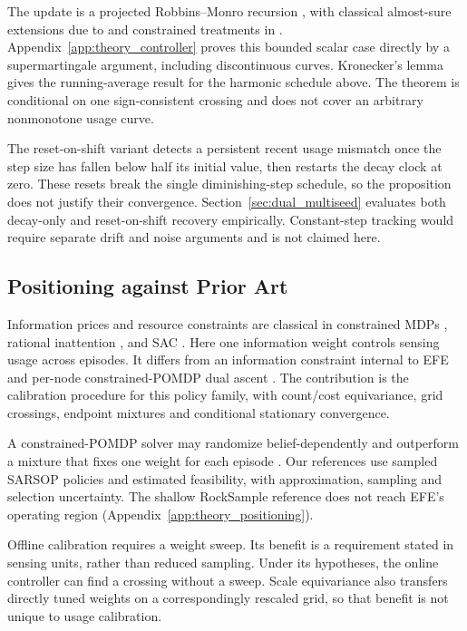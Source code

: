 \documentclass[runningheads]{llncs}
\begin{document}
The update is a projected Robbins--Monro recursion \citep{robbins1951}, with classical almost-sure extensions due to \citet{blum1954} and constrained treatments in \citet{kushner1978}. Appendix~\ref{app:theory_controller} proves this bounded scalar case directly by a supermartingale argument, including discontinuous curves. Kronecker's lemma gives the running-average result for the harmonic schedule above. The theorem is conditional on one sign-consistent crossing and does not cover an arbitrary nonmonotone usage curve.

The reset-on-shift variant detects a persistent recent usage mismatch once the step size has fallen below half its initial value, then restarts the decay clock at zero. These resets break the single diminishing-step schedule, so the proposition does not justify their convergence. Section~\ref{sec:dual_multiseed} evaluates both decay-only and reset-on-shift recovery empirically. Constant-step tracking would require separate drift and noise arguments and is not claimed here.

\subsection{Positioning against Prior Art}
\label{sec:budget_positioning}

Information prices and resource constraints are classical in constrained MDPs \citep{altman1999}, rational inattention \citep{sims2003,matejka2015}, and SAC \citep{haarnoja2018sac}. Here one information weight controls sensing usage across episodes. It differs from an information constraint internal to EFE \citep{kouw2026bethe} and per-node constrained-POMDP dual ascent \citep{stocco2024recursive}. The contribution is the calibration procedure for this policy family, with count/cost equivariance, grid crossings, endpoint mixtures and conditional stationary convergence.

A constrained-POMDP solver may randomize belief-dependently and outperform a mixture that fixes one weight for each episode \citep{kim2011cpomdp}. Our references use sampled SARSOP policies and estimated feasibility, with approximation, sampling and selection uncertainty. The shallow RockSample reference does not reach EFE's operating region (Appendix~\ref{app:theory_positioning}).

Offline calibration requires a weight sweep. Its benefit is a requirement stated in sensing units, rather than reduced sampling. Under its hypotheses, the online controller can find a crossing without a sweep. Scale equivariance also transfers directly tuned weights on a correspondingly rescaled grid, so that benefit is not unique to usage calibration.
\end{document}
